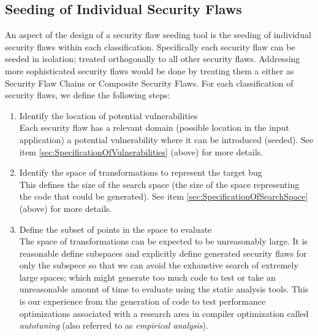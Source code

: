 \subsection{Seeding of Individual Security Flaws}
         \label{sec:SeedingOfSecurityFlaws}
         An aspect of the design of a security flaw seeding tool is the seeding of individual
         security flaws within each classification. Specifically each security flaw can be
         seeded in isolation; treated orthogonally to all other security flaws. Addressing
         more sophisticated security flaws would be done by treating them a either as
         Security Flaw Chains or Composite Security Flaws.
         For each classification of security flaws, we define the following steps:
            \begin{enumerate}
               \item Identify the location of potential vulnerabilities \\ Each security
                     flaw has a relevant domain (possible location in the input
                     application) a potential vulnerability where it 
                     can be introduced (seeded).  See item 
                     \ref{sec:SpecificationOfVulnerabilities} (above) for more details.

               \item Identify the space of transformations to represent the target bug \\
                     This defines the size of the search space (the size of the 
                     space representing the code that could be generated). See item 
                     \ref{sec:SpecificationOfSearchSpace} (above) for more details.

               \item Define the subset of points in the space to evaluate \\ 
                     The space of transformations can be expected to be unreasonably
                     large. It is reasonable define subspaces and explicitly define 
                     generated security flaws for only the subspece so that we can
                     avoid the exhaustive search of extremely large spaces; which might
                     generate too much code to test or take an unreasonable amount of time
                     to evaluate using the static analysis tools. This is our experience
                     from the generation of code to test performance optimizations
                     associated with a research area in compiler optimization called 
                     {\em autotuning} (also referred to as {\em empirical analysis}).


\end{enumerate}
